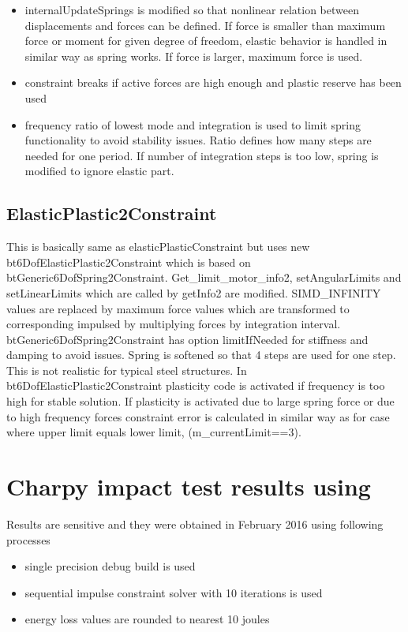 \begin{itemize}
\item internalUpdateSprings is modified so that nonlinear relation between displacements and forces can be defined. 
 If force is smaller than maximum force or moment for given degree of freedom,
  elastic behavior is handled in similar way as spring works. 
  If force is larger, maximum force is used. 
\item constraint breaks if active forces are high enough and plastic reserve has been used
\item frequency ratio of lowest mode and integration is used to limit spring functionality to avoid stability issues. 
 Ratio defines how many steps are needed for one period. 
 If number of integration steps is too low, spring is modified to ignore elastic part.
\end{itemize}

\subsection{ElasticPlastic2Constraint}
This is basically same as elasticPlasticConstraint but uses new bt6DofElasticPlastic2Constraint 
which is based on btGeneric6DofSpring2Constraint.
Get\_limit\_motor\_info2, setAngularLimits and setLinearLimits which are called by getInfo2 are modified. 
SIMD\_INFINITY values are replaced by maximum force values which are transformed to
corresponding impulsed by multiplying forces by integration interval.
btGeneric6DofSpring2Constraint has option limitIfNeeded for stiffness and damping to avoid issues. 
Spring is softened so that 4 steps are used for one step. This is not realistic for typical steel structures. 
In bt6DofElasticPlastic2Constraint plasticity code is activated if frequency is too high for stable solution.
If plasticity is activated due to large spring force or due to high frequency forces constraint error is 
calculated in similar way as for case where upper limit equals lower limit, (m\_currentLimit==3).

\section{Charpy impact test results using \bullet}
\label{sec:bullet-charpy-results}
Results are sensitive and they were obtained in February 2016 using following processes
\begin{itemize}
\item single precision debug build is used
\item sequential impulse constraint solver with 10 iterations is used
\item energy loss values are rounded to nearest 10 joules 
\end{itemize}

